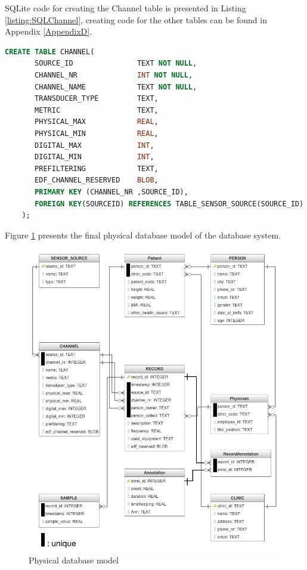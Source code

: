 SQLite code for creating the Channel table is presented in Listing \ref{listing:SQLChannel}, creating code for the other tables can be found in Appendix \ref{AppendixD}.\\
\begin{minipage}{\linewidth}
\begin{lstlisting}[caption={SQLite code for creating table Channel}, label = {listing:SQLChannel},language=SQL]
    CREATE TABLE CHANNEL(
	   SOURCE_ID               TEXT NOT NULL,
	   CHANNEL_NR              INT NOT NULL,
	   CHANNEL_NAME            TEXT NOT NULL,
	   TRANSDUCER_TYPE         TEXT,
	   METRIC                  TEXT,
	   PHYSICAL_MAX            REAL,
	   PHYSICAL_MIN            REAL,
	   DIGITAL_MAX             INT,
	   DIGITAL_MIN             INT,
	   PREFILTERING            TEXT,
	   EDF_CHANNEL_RESERVED    BLOB,
	   PRIMARY KEY (CHANNEL_NR ,SOURCE_ID),
       FOREIGN KEY(SOURCEID) REFERENCES TABLE_SENSOR_SOURCE(SOURCE_ID)
	);
\end{lstlisting}
\end{minipage}
Figure \ref{fig:Figures/FinalTable} presents the final physical database model of the database system.
\begin{figure}
    \centering
    \includegraphics[width=1.0\textwidth]{Figures/FinalTable.png}
    \caption{Physical database model}
    \label{fig:Figures/FinalTable}
\end{figure}
